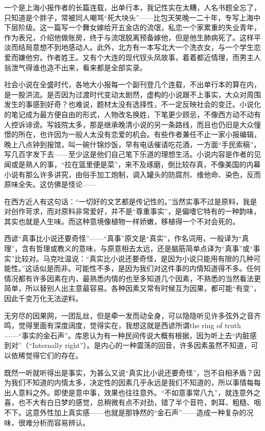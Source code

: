 \par 一个是上海小报作者的长篇连载，出单行本，我记性实在太糟，人名书题全忘了，只知道是个胖子，常被同人嘲骂“死大块头”——比包天笑晚一二十年，专写上海中下层阶级。这一篇写一个舞女嫁给开五金店的流氓，私恋一个家累重的失业青年，作为表兄，介绍他做账房，终于与流氓脱离预备嫁他，但是他生肺病死了。这样平淡而结局意想不到地感动人。此外，北方有一本写北大一个洗衣女，与一个学生恋爱而嫌他穷。作者姓王。又有个大连的现代钗头凤故事，着着都近情理，而男主人翁泄气得谁也造不出来，看来都是全部实录。
\par 社会小说在全盛时代，各地大小报每一个副刊登几个连载，不出单行本的算在内，是一股洪流。是否因为过渡时代变动太剧然，虚构的小说跟不上事实，大众对周围发生的事感到好奇？也难说，题材太没有选择性，不一定反映社会的变迁。小说化的笔记成为最方便自由的形式，人物改名换姓，下笔更少顾忌，不像西方动不动有人控诉诽谤。写妓院太多，那是继承晚清小说的另一条路线，而且也仍旧是大众憧憬的所在，也许因为一般人太没有恋爱的机会。有些作者兼任不止一家小报编辑，晚上八点钟到报馆，叫一碗什锦炒饭，早有电话催请吃花酒，一方面“手民索稿”，写几百字发下去——至少这是他们自己笔下乐道的理想生活。小说内容是作者的见闻或是熟人的事，“拉在篮里便是菜”，来不及琢磨，倒比较存真，不像美国的内幕小说有那么许多讲究，由俗手加工炮制，调入罐头的防腐剂、维他命、染色，反而原味全失。这仿佛是怪论——
\par 在西方近人有这句话：“一切好的文艺都是传记性的。”当然实事不过是原料，我是对创作苛求，而对原料非常爱好，并不是“尊重事实”，是偏嗜它特有的一种韵味，其实也就是人生味。而这种意境像植物一样娇嫩，移植得一个不对会死的。
\par 西谚“真事比小说还要奇怪”——“真事”原文是“真实”，作名词用，一般译为“真理”，含有哲理或教义的意味，与原意相去太远，还是脑筋简单点译为“真事”或“事实”比较对。马克吐温说：“真实比小说还要奇怪，是因为小说只能用有限的几种可能性。”这话似是而非。可能性不多，是因为我们对这件事的内情知道得不多。任何情况都有许多因素在内，最熟悉内情的也至多知道几个因素，不熟悉的当然看法更简单，所以替别人出主意最容易。各种因素又常有时候互为因果，都可能“有变”，因此千变万化无法逆料。
\par 无穷尽的因果网，一团乱丝，但是牵一发而动全身，可以隐隐听见许多弦外之音齐鸣，觉得里面有深度阔度，觉得实在，我想这就是西谚所谓the ring of truth ——“事实的金石声”。库恩认为有一种民间传说大概有根据，因为听上去“内脏感到对”（“Internally right”）。是内心的一种震荡的回音，许多因素虽然不知道，可以依稀觉得它们的存在。
\par 既然一听就听得出是事实，为甚么又说“真实比小说还要奇怪”，岂不自相矛盾？因为我们不知道的内情太多，决定性的因素几乎永远是我们不知道的，所以事情每每出人意料之外。即使是意中事，效果也往往意外。“不如意事常八九”，就连意外之喜，也不大有白日梦的感觉，总稍微有点不对劲，错了半个音符，刺耳、粗糙、咽不下。这意外性加上真实感——也就是那铮然的“金石声”——造成一种复杂的况味，很难分析而容易辨认。
